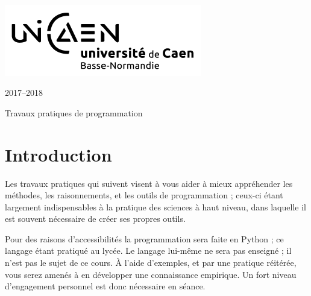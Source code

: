 \documentclass[a4paper,11pt]{article}
\begin{document}
%
\thispagestyle{empty}
\renewcommand{\headrulewidth}{0.0pt}
%

\setlength{\columnsep}{30pt}
\setlength{\columnseprule}{1pt}
\noindent
\begin{minipage}[t]{0.35\textwidth}
~\\[-2ex]
\includegraphics[scale=0.7]{unicaen_logo_rvb_noir_V1}

\end{minipage}
\begin{minipage}[t]{0.50\textwidth}
\end{minipage}
\begin{minipage}[t]{0.12\textwidth}
\flushleft
{
\footnotesize{2017--2018}}
\end{minipage}

\vspace{0.5cm}

\centerline{\sc\Large Travaux pratiques de programmation}
{\let\clearpage\relax \section*{Introduction}}
Les travaux pratiques qui suivent visent à vous aider à mieux appréhender 
les méthodes, les raisonnements, et les outils de programmation ;
ceux-ci étant largement indispensables à la pratique des sciences à
haut niveau, dans laquelle il est souvent nécessaire
de créer ses propres outils. 

Pour des raisons d'accessibilités la programmation sera faite en Python ;
ce langage étant pratiqué au lycée. Le langage lui-même ne sera pas enseigné ; 
il n'est pas le sujet de ce cours.
À l'aide d'exemples, et par une pratique réitérée, 
vous serez amenés à en développer une connaissance empirique. 
Un fort niveau d'engagement personnel est donc nécessaire en séance. 
\end{document}
